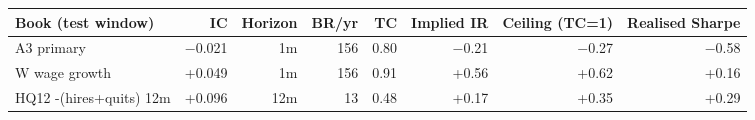 \begin{tabular}{lrrrrrrr}
\toprule
Book (test window) & IC & Horizon & BR/yr & TC & Implied IR & Ceiling (TC=1) & Realised Sharpe \\
\midrule
A3 primary & $-$0.021 & 1m & 156 & 0.80 & $-$0.21 & $-$0.27 & $-$0.58 \\
W wage growth & +0.049 & 1m & 156 & 0.91 & +0.56 & +0.62 & +0.16 \\
HQ12 -(hires+quits) 12m & +0.096 & 12m & 13 & 0.48 & +0.17 & +0.35 & +0.29 \\
\bottomrule
\end{tabular}
